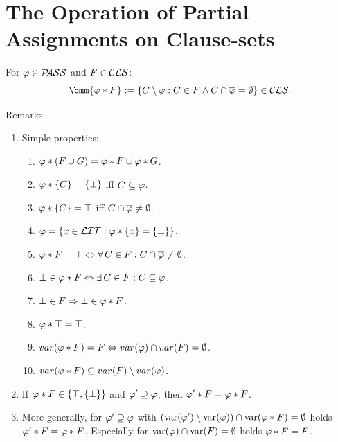 \documentclass[12pt]{book}
\begin{document}
\section{The Operation of Partial Assignments on Clause-sets}
\label{sec:oppasscls}

\begin{defi}\label{def:oppassCls}
      For $\varphi \in \mathcal{P\hspace{-0.32em}ASS}$ and $F \in \mathcal{CLS}$:
      $$\bmm{\vp * F} := \set{C \sm \vp : C \in F \wedge C \cap \ol{\vp} = \es} \in \Cls.$$
\end{defi}
Remarks:
\begin{enumerate}
      \item Simple properties:
      \begin{enumerate}
            \item $\varphi * (F \cup G) = \varphi * F \cup \varphi * G$.
            \item $\varphi * \{ C \} = \{ \bot \}$ iff $C \subseteq \varphi$.
            \item $\varphi * \{ C \} = \top$ iff $C \cap \overline{\varphi} \ne \emptyset$.
            \item $\varphi = \{ x \in \mathcal{LIT} : \varphi * \{ x \} = \{ \bot \} \}$.
            \item $\varphi * F = \top \Leftrightarrow \forall\, C \in F : C \cap \overline{\varphi} \ne \emptyset$.
            \item $\bot \in \varphi * F \Leftrightarrow \exists\, C \in F : C \subseteq \varphi$.
            \item $\bot \in F \Rightarrow \bot \in \varphi * F$.
            \item $\varphi * \top = \top$.
            \item $ var(\varphi * F) = F \Leftrightarrow var(\varphi) \cap var(F) = \emptyset$.
            \item $ var(\varphi * F) \subseteq var(F) \setminus var(\varphi)$.
      \end{enumerate}
      \item If $\varphi * F \in \{ \top, \{ \bot \} \}$ and $\varphi' \supseteq \varphi$, then $\varphi' * F = \varphi * F$.
      \item More generally, for $\varphi' \supseteq \varphi$ with $(\operatorname{var}(\varphi') \setminus \operatorname{var}(\varphi)) \cap \operatorname{var}(\varphi * F) = \emptyset$ holds $\varphi' * F = \varphi * F$. 
	  Especially for $\operatorname{var}(\varphi) \cap \operatorname{var}(F) = \emptyset$ holds $\varphi * F = F$.
\end{enumerate}
\end{document}
